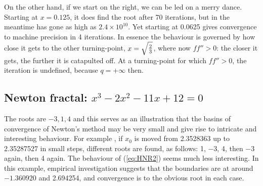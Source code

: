 On the other hand, if we start on the right, we can be led on a merry dance. Starting at $x=0.125$, it does find the root after 70 iterations, but in the meantime has gone as high as $2.4\times10^{10}$.
Yet starting at 0.0625 gives convergence to machine precision in 4 iterations. In essence the behaviour is governed by how close it gets to the other turning-point, $x=\sqrt{2\over3}$, where now $ff''>0$: the closer it gets, the further it is catapulted off. At a turning-point for which $ff''>0$, the iteration is undefined, because $q=+\infty$ then.


\subsection*{Newton fractal: $x^3-2x^2-11x+12=0$}
The roots are $-3,1,4$ and this serves as an illustration that the basins of convergence of Newton's method may be very small and give rise to intricate and interesting behaviour. For example \cite{Dence97}, if $x_0$ is moved from 2.3528363 up to 2.35287527 in small steps, different roots are found, as follows: 1, $-3$, 4, then $-3$ again, then 4 again. The behaviour of (\ref{eq:HNR2}) seems much less interesting. In this example, empirical investigation suggests that the boundaries are at around $-1.360920$ and 2.694254, and convergence is to the obvious root in each case.









